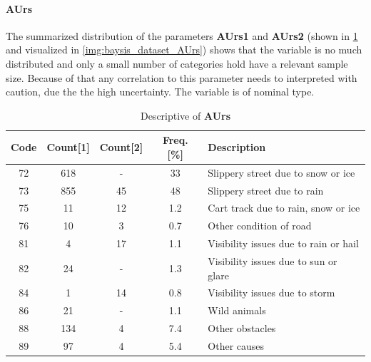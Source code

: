 \paragraph{AUrs}
\label{baysis_dataset_AUrs}
The summarized distribution of the parameters \textbf{AUrs1} and \textbf{AUrs2} (shown in \cref{tbl:baysis_dataset_AUrs} and visualized in \cref{img:baysis_dataset_AUrs}) shows that the variable is no much distributed and only a small number of categories hold have a relevant sample size. Because of that any correlation to this parameter needs to interpreted with caution, due the the high uncertainty. The variable is of nominal type.
\begin{table}[ht]
	\centering
	\small
	\begin{tabular}{c|c|c|c|l}
		\toprule
		Code & Count[1] & Count[2] & Freq. [\%] & Description \\ 
		\midrule
		72 & 618	& -		& 33  & Slippery street due to snow or ice \\
		73 & 855	& 45	& 48  & Slippery street due to rain \\
		75 & 11		& 12	& 1.2 & Cart track due to rain, snow or ice \\
		76 & 10		& 3		& 0.7 & Other condition of road \\
		81 & 4		& 17 	& 1.1 & Visibility issues due to rain or hail \\
		82 & 24		& -		& 1.3 & Visibility issues due to sun or glare \\
		84 & 1		& 14	& 0.8 & Visibility issues due to storm \\
		86 & 21		& -		& 1.1 & Wild animals \\
		88 & 134	& 4		& 7.4 & Other obstacles \\
		89 & 97		& 4		& 5.4 & Other causes \\
		\bottomrule
	\end{tabular}
	\caption{Descriptive of \textbf{AUrs}}
	\label{tbl:baysis_dataset_AUrs}
	\vspace{-8mm}
\end{table}

